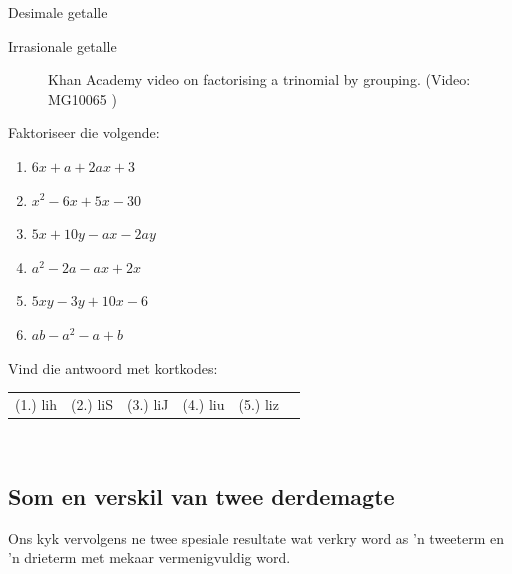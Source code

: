 \begin{Aktiwiteit}{Desimale getalle}
\begin{aktiwiteit}{Irrasionale getalle}
\noindent
\label{m39394*eip-280}
\setcounter{subfigure}{0}
\begin{figure}[H] %
\textnormal{Khan Academy video on factorising a trinomial by grouping.}\vspace{.1in} \nopagebreak
\label{m39394*yt-media32}\label{m39394*yt-video32}
 { (Video:  MG10065 )}
\vspace{2pt}
\vspace{.1in}
\end{figure}       
\par \label{m39394*secfhsst!!!underscore!!!id2920}


\begin{exercises}{}{
\nopagebreak
Faktoriseer die volgende:
\begin{multicols}{2}
\begin{enumerate}[itemsep=5pt, label=\textbf{\arabic*}. ] 
\item $6x+a+2ax+3$
\item ${x}^{2}-6x+5x-30$
\item $5x+10y-ax-2ay$
\item ${a}^{2}-2a-ax+2x$
\item $5xy-3y+10x-6$
\item $ab - a^{2} - a + b$
\end{enumerate}
\end{multicols}

\par {} Vind die antwoord met kortkodes:
\par \begin{tabular}[h]{cccccc}
(1.) lih  &  (2.) liS  &  (3.) liJ  &  (4.) liu  &  (5.) liz  & \end{tabular}
}
\end{exercises}

\
\subsection*{Som en verskil van twee derdemagte}      
Ons kyk vervolgens ne twee spesiale resultate wat verkry word as 'n tweeterm en 'n drieterm met mekaar vermenigvuldig word. 


\end{aktiwiteit}
\end{Aktiwiteit}
